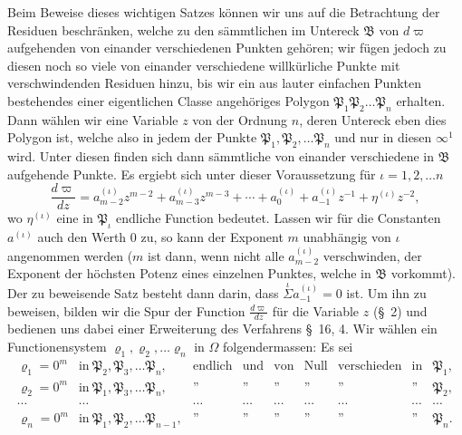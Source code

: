 \documentclass{article}
\begin{document}
Beim Beweise dieses wichtigen Satzes können wir uns auf die Betrachtung der Residuen beschränken, welche zu den sämmtlichen im Untereck $\mathfrak{B}$ von $d\varpi$ aufgehenden von einander verschiedenen Punkten gehören; wir fügen jedoch zu diesen noch so viele von einander verschiedene willkürliche Punkte mit verschwindenden Residuen hinzu, bis wir ein aus lauter einfachen Punkten bestehendes einer eigentlichen Classe angehöriges Polygon $\mathfrak{P}_{1}\mathfrak{P}_{2}\ldots\mathfrak{P}_{n}$ erhalten. Dann wählen wir eine Variable $z$ von der Ordnung $n$, deren Untereck eben dies Polygon ist, welche also in jedem der Punkte $\mathfrak{P}_{1}, \mathfrak{P}_{2}, \ldots \mathfrak{P}_{n}$ und nur in diesen $\infty^{1}$ wird. Unter diesen finden sich dann sämmtliche von einander verschiedene in $\mathfrak{B}$ aufgehende Punkte. Es ergiebt sich unter dieser Voraussetzung für $\iota = 1, 2, \ldots n$
\[ \frac{d\varpi}{dz} = a_{m-2}^{(\iota)}z^{m-2}+a_{m-3}^{(\iota)}z^{m-3}+\cdots+a_{0}^{(\iota)}+a_{-1}^{(\iota)}z^{-1}+\eta^{(\iota)}z^{-2}, \tag{3.} \]
wo $\eta^{(\iota)}$ eine in $\mathfrak{P}_{\iota}$ endliche Function bedeutet. Lassen wir für die Constanten $a^{(\iota)}$ auch den Werth 0 zu, so kann der Exponent $m$ unabhängig von $\iota$ angenommen werden ($m$ ist dann, wenn nicht alle $a_{m-2}^{(\iota)}$ verschwinden, der Exponent der höchsten Potenz eines einzelnen Punktes, welche in $\mathfrak{B}$ vorkommt). Der zu beweisende Satz besteht dann darin, dass $\overset{\iota}{\Sigma} a_{-1}^{(\iota)} = 0$ ist. Um ihn zu beweisen, bilden wir die Spur der Function $\frac{d\varpi}{dz}$ für die Variable $z$ (§~2) und bedienen uns dabei einer Erweiterung des Verfahrens §~16, 4. Wir wählen ein Functionensystem $\varrho_{1}, \varrho_{2}, \ldots \varrho_{n}$ in $\Omega$ folgendermassen: Es sei
\[ \begin{matrix}
\varrho_{1} = 0^{m} & \text{in}\ \mathfrak{P}_{2}, \mathfrak{P}_{3}, \ldots \mathfrak{P}_{n}, & \text{endlich} & \text{und} & \text{von} & \text{Null} & \text{verschieden} & \text{in} & \mathfrak{P}_{1}, \\
\varrho_{2} = 0^{m} & \text{in}\ \mathfrak{P}_{1}, \mathfrak{P}_{3}, \ldots \mathfrak{P}_{n}, & \text{''} & \text{''} & \text{''} & \text{''} & \text{''} & \text{''} & \mathfrak{P}_{2}, \\
\cdots & \cdots & \cdots & \cdots & \cdots & \cdots & \cdots & \cdots & \cdots \\
\varrho_{n} = 0^{m} & \text{in}\ \mathfrak{P}_{1}, \mathfrak{P}_{2}, \ldots \mathfrak{P}_{n-1}, & \text{''} & \text{''} & \text{''} & \text{''} & \text{''} & \text{''} & \mathfrak{P}_{n}.
\end{matrix} \]
\end{document}
